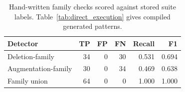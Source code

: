 \begin{table}[t]
\centering
\caption{Hand-written family checks scored against stored suite labels. Table~\ref{tab:direct_execution} gives compiled generated patterns.}
\label{tab:rule_family_final_ablation}
\footnotesize
\setlength{\tabcolsep}{3pt}
\begin{tabular*}{\columnwidth}{@{\extracolsep{\fill}}lrrrrr@{}}
\toprule
Detector & TP & FP & FN & Recall & F1 \\
\midrule
Deletion-family & 34 & 0 & 30 & 0.531 & 0.694 \\
Augmentation-family & 30 & 0 & 34 & 0.469 & 0.638 \\
Family union & 64 & 0 & 0 & 1.000 & 1.000 \\
\bottomrule
\end{tabular*}
\end{table}
